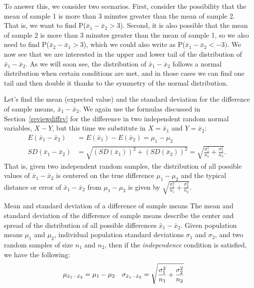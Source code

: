 To answer this, we consider two scenarios.
First, consider the possibility that the mean of sample 1
is more than 3 minutes greater than the mean of sample 2.
That is, we want to find P($\bar{x}_1 - \bar{x}_2 > 3$).
Second, it is also possible that the mean of sample 2 is more than
3 minutes greater than the mean of sample 1, so we also need to
find P($\bar{x}_2 - \bar{x}_1 > 3$), which we could also write as
P($\bar{x}_1 - \bar{x}_2 < -3)$.
We now see that we are interested in the upper and lower tail of
the distribution of $\bar{x}_1 - \bar{x}_2$.
As we will soon see, the distribution of $\bar{x}_1 - \bar{x}_2$
follows a normal distribution when certain conditions are met,
and in those cases we can find one tail and then double it thanks
to the symmetry of the normal distribution.

Let's find the mean (expected value) and the standard deviation for the difference of sample means, $\bar{x}_1 - \bar{x}_2$. We again use the formulas discussed in Section~\ref{reviewdiffrv} for the difference in two independent random normal variables, $X - Y$, but this time we substitute in $X = \bar{x}_1$ and $Y = \bar{x}_2$:
\begin{align*}
E(\bar{x}_1 - \bar{x}_2)
  &= E(\bar{x}_1) - E(\bar{x}_2) = \mu_1 - \mu_2 \\
SD(\bar{x}_1 - \bar{x}_2)
  &= \sqrt{(SD(\bar{x}_1))^2 + (SD(\bar{x}_2))^2}
  =  \sqrt{\frac{\sigma_1^2}{n_1} + \frac{\sigma_2^2}{n_2}}.
\end{align*}
That is, given two independent random samples, the distribution of all possible values of $\bar{x}_1 - \bar{x}_2$ is centered on the true difference $\mu_1-\mu_2$ and the typical distance or error of $\bar{x}_1 - \bar{x}_2$ from $\mu_1-\mu_2$ is given by $\sqrt{\frac{\sigma_1^2}{n_1} + \frac{\sigma_2^2}{n_2}}$.

\begin{onebox}{Mean and standard deviation of a difference of sample means}
The mean and standard deviation of the difference of sample means describe the center and spread of the distribution of all possible differences $\bar{x}_1-\bar{x}_2$.
Given population means $\mu_1$ and $\mu_2$, individual population
standard deviations $\sigma_1$ and $\sigma_2$, and two random samples
of size $n_1$ and $n_2$, then if the \emph{independence} condition
is satisfied, we have the following:
\begin{align*}
\mu_{\bar{x}_1 - \bar{x}_2} &= \mu_1 - \mu_2
	& \sigma_{\bar{x}_1 - \bar{x}_2}&=  \sqrt{\frac{\sigma_1^2}{n_1} + \frac{\sigma_2^2}{n_2}}
\vspace{1mm}
\end{align*}
\end{onebox}

